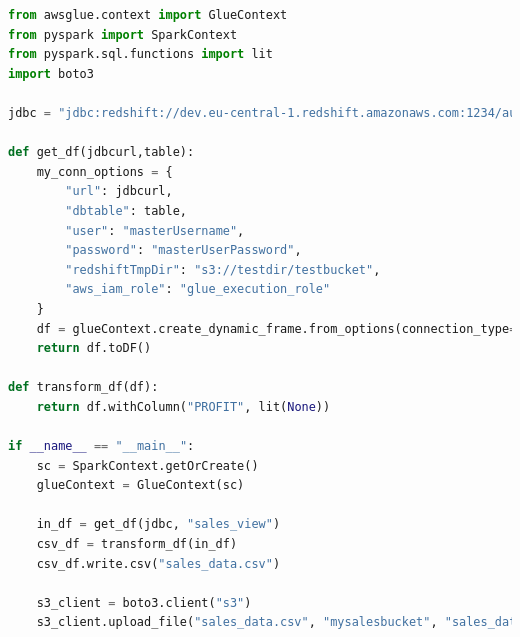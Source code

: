 \begin{lstlisting}[language=Python,caption=Source code of an ETL job demonstrating embedded code analysis,label=fig:evaluationCode]
from awsglue.context import GlueContext
from pyspark import SparkContext
from pyspark.sql.functions import lit
import boto3

jdbc = "jdbc:redshift://dev.eu-central-1.redshift.amazonaws.com:1234/automated_test"

def get_df(jdbcurl,table):
    my_conn_options = {
        "url": jdbcurl,
        "dbtable": table,
        "user": "masterUsername",
        "password": "masterUserPassword",
        "redshiftTmpDir": "s3://testdir/testbucket",
        "aws_iam_role": "glue_execution_role"
    }
    df = glueContext.create_dynamic_frame.from_options(connection_type="redshift", connection_options=my_conn_options)
    return df.toDF()

def transform_df(df):
    return df.withColumn("PROFIT", lit(None))

if __name__ == "__main__":
    sc = SparkContext.getOrCreate()
    glueContext = GlueContext(sc)
    
    in_df = get_df(jdbc, "sales_view")
    csv_df = transform_df(in_df)
    csv_df.write.csv("sales_data.csv")
    
    s3_client = boto3.client("s3")
    s3_client.upload_file("sales_data.csv", "mysalesbucket", "sales_data.csv")
\end{lstlisting}


